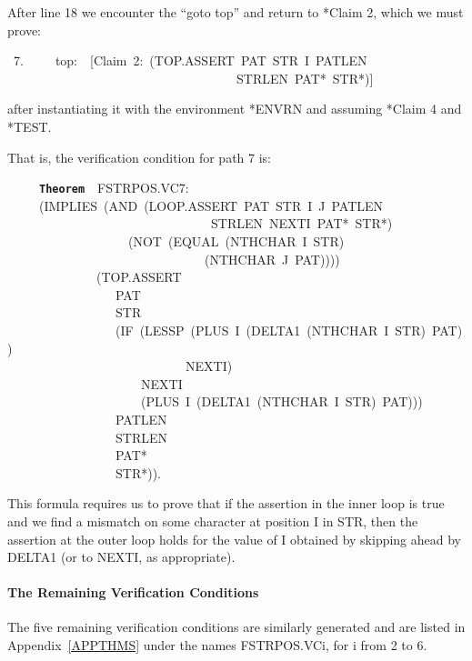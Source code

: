 \documentclass[11pt]{book}
\newenvironment{pubasis}{\begin{flushleft}\ttfamily\small}{\normalsize\rmfamily\end{flushleft}}
\newcommand{\axiomordefinition}[1]{\vspace{6pt}\texttt{\textbf{#1}}}
\newcommand{\pubdefaulttextsize}{\large}
\begin{document}
After line 18 we encounter the ``goto top'' and return to *Claim 2,
which we must prove:
\begin{pubasis}
~7.~~~~~top:~~{[}Claim~2:~(TOP.ASSERT~PAT~STR~I~PATLEN\\
~~~~~~~~~~~~~~~~~~~~~~~~~~~~~~~~~~~~STRLEN~PAT*~STR*)]\\
\end{pubasis}
after instantiating it  with the environment *ENVRN and assuming *Claim 4 and *TEST.

That is, the verification condition for path 7 is:
\begin{pubasis}
~~~~~\axiomordefinition{Theorem}~~FSTRPOS.VC7:\\
~~~~~(IMPLIES~(AND~(LOOP.ASSERT~PAT~STR~I~J~PATLEN\\
~~~~~~~~~~~~~~~~~~~~~~~~~~~~~~~~STRLEN~NEXTI~PAT*~STR*)\\
~~~~~~~~~~~~~~~~~~~(NOT~(EQUAL~(NTHCHAR~I~STR)\\
~~~~~~~~~~~~~~~~~~~~~~~~~~~~~~~(NTHCHAR~J~PAT))))\\
~~~~~~~~~~~~~~(TOP.ASSERT\\
~~~~~~~~~~~~~~~~~PAT\\
~~~~~~~~~~~~~~~~~STR\\
~~~~~~~~~~~~~~~~~(IF~(LESSP~(PLUS~I~(DELTA1~(NTHCHAR~I~STR)~PAT))\\
~~~~~~~~~~~~~~~~~~~~~~~~~~~~NEXTI)\\
~~~~~~~~~~~~~~~~~~~~~NEXTI\\
~~~~~~~~~~~~~~~~~~~~~(PLUS~I~(DELTA1~(NTHCHAR~I~STR)~PAT)))\\
~~~~~~~~~~~~~~~~~PATLEN\\
~~~~~~~~~~~~~~~~~STRLEN\\
~~~~~~~~~~~~~~~~~PAT*\\
~~~~~~~~~~~~~~~~~STR*)).\\
\end{pubasis}
This formula requires us to prove that if the assertion in the
inner loop is true and we find a mismatch on some character at position
I in STR, then the assertion at the outer loop holds for the value of
I obtained by skipping ahead by DELTA1 (or to NEXTI, as appropriate).
\paragraph{The Remaining Verification Conditions}
\pubdefaulttextsize
The five remaining verification conditions are similarly generated and
are listed in Appendix~\ref{APPTHMS} under the names FSTRPOS.VCi, for i from 2 to 6.
\end{document}
